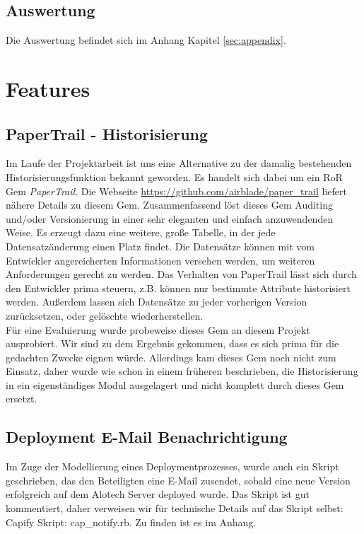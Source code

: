 \documentclass[12pt,             %
               a4paper,          %
               listof=totoc,     %
               index=totoc,      %
               bibliography=totoc,%
               oneside,         %
               BCOR1cm,          %
               english   %
               ]{scrbook}
\begin{document}
\section{Auswertung}
Die Auswertung befindet sich im Anhang Kapitel \vref{sec:appendix}.

\chapter{Features}
\section{PaperTrail - Historisierung}
Im Laufe der Projektarbeit ist uns eine Alternative zu der damalig bestehenden Historisierungsfunktion bekannt geworden. Es handelt sich dabei um ein RoR Gem \textit{PaperTrail}. Die Webseite \url{https://github.com/airblade/paper_trail} liefert nähere Details zu diesem Gem. Zusammenfassend löst dieses Gem  Auditing und/oder Versionierung in einer sehr eleganten und einfach anzuwendenden Weise. Es erzeugt dazu eine weitere, große Tabelle, in der jede Datensatzänderung einen Platz findet. Die Datensätze können mit vom Entwickler angereicherten Informationen versehen werden, um weiteren Anforderungen gerecht zu werden. Das Verhalten von PaperTrail lässt sich durch den Entwickler prima steuern, z.B. können nur bestimmte Attribute historisiert werden. Außerdem lassen sich Datensätze zu jeder vorherigen Version zurücksetzen, oder gelöschte wiederherstellen.\\
Für eine Evaluierung wurde probeweise dieses Gem an diesem Projekt ausprobiert. Wir sind zu dem Ergebnis gekommen, dass es sich prima für die gedachten Zwecke eignen würde. Allerdings kam dieses Gem noch nicht zum Einsatz, daher wurde wie schon in einem früheren beschrieben, die Historisierung in ein eigenständiges Modul ausgelagert und nicht komplett durch dieses Gem ersetzt.


\section{Deployment E-Mail Benachrichtigung}
Im Zuge der Modellierung eines Deploymentprozesses, wurde auch ein Skript geschrieben, das den Beteiligten eine E-Mail zusendet, sobald eine neue Version erfolgreich auf dem Alotech Server deployed wurde. Das Skript ist gut kommentiert, daher verweisen wir für technische Details auf das Skript selbst: Capify Skript: \glqq cap\_notify.rb\grqq. Zu finden ist es im Anhang.
\end{document}
